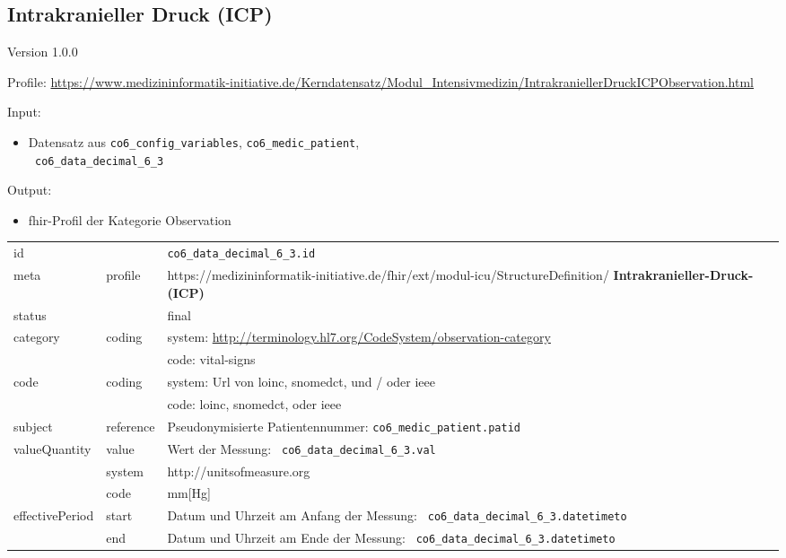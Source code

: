 \subsection{Intrakranieller Druck (ICP)} 
\noindent Version 1.0.0

\noindent Profile: \url{https://www.medizininformatik-initiative.de/Kerndatensatz/Modul_Intensivmedizin/IntrakraniellerDruckICPObservation.html}

\noindent Input:
\begin{itemize}
	\item Datensatz aus \texttt{co6\_config\_variables}, \texttt{co6\_medic\_patient}, \\ \texttt{
co6\_data\_decimal\_6\_3}
\end{itemize}
Output:
\begin{itemize}
        \item \ac{fhir}-Profil der Kategorie \glqq Observation\grqq{}
\end{itemize}
\begin{longtable}{|l|l|p{7.5cm}|}
        \hline
        \rowcolor{lightgray} \multicolumn{3}{|l|}{Data Mapping (inhaltlich)} \\ \hline
        id &  & \texttt{co6\_data\_decimal\_6\_3.id} \\ \hline
	meta & profile & https://medizininformatik-initiative.de/fhir/ext/modul-icu/StructureDefinition/\textbf{
Intrakranieller-Druck-(ICP)} \\ \hline 
	status &  & final  \\ \hline 
	category & coding & system: \url{http://terminology.hl7.org/CodeSystem/observation-category} \\
\cline{3-3}
	& & code: vital-signs \\ \hline
	code & coding & system: Url von \ac{loinc}, \ac{snomedct}, und / oder \ac{ieee} \\ 
	\cline{3-3} 
	 &  & code: \ac{loinc}, \ac{snomedct}, oder \ac{ieee} \\ \hline
	subject & reference & Pseudonymisierte Patientennummer: \texttt{co6\_medic\_patient.patid} \\ \hline
	valueQuantity & value & Wert der Messung: \texttt{
co6\_data\_decimal\_6\_3.val} \\
        \cline{2-3}
         & system & http://unitsofmeasure.org \\
         \cline{2-3}
         & code & mm[Hg] \\ \hline
    effectivePeriod & start & Datum und Uhrzeit am Anfang der Messung: \texttt{
co6\_data\_decimal\_6\_3.datetimeto} \\
    \cline{2-3}
     & end & Datum und Uhrzeit am Ende der Messung: \texttt{
co6\_data\_decimal\_6\_3.datetimeto} \\ \hline
\end{longtable}


